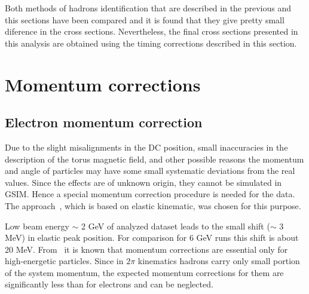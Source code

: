 Both methods of hadrons identification that are described in the previous and this sections have been compared and it is found that they give pretty small diference in the cross sections.
Nevertheless, the final cross sections presented in this analysis are obtained using the timing corrections described in this section. 

\section{Momentum corrections}
\label{momcorr}



\subsection{Electron momentum correction}
\label{electronmomcor}

Due to the slight misalignments in the DC position,  small inaccuracies in
the description of the torus magnetic field, and other possible reasons the momentum and angle of
particles may have some small systematic deviations from the real values. 
Since the effects are of unknown origin, they cannot be simulated in GSIM. 
Hence a special momentum correction procedure is needed for the data. The approach~\cite{KPark:momcorr}, which is based on elastic kinematic, was chosen for this purpose. 

Low beam energy $\sim$ 2 GeV of analyzed dataset leads to the small shift ($\sim$ 3 MeV) in elastic peak position. For comparison for 6 GeV runs this shift is about 20 MeV.  
From~\cite{KPark:momcorr} it is known that momentum corrections are essential only for high-energetic particles. Since in $2\pi$ kinematics hadrons carry only small portion of the system momentum,  the expected momentum  corrections for them are significantly less than for electrons and can be neglected.


